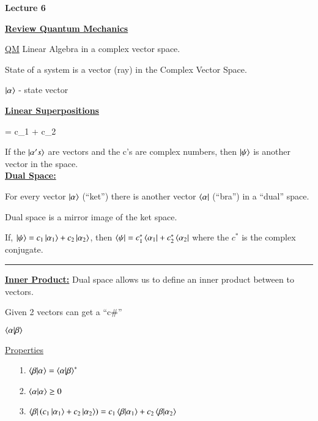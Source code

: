 



\thispagestyle{fancy}

\begin{center}
{\huge \textbf{Lecture 6}}
\end{center}

{\fontsize{14}{16}\selectfont

\textbf{\underline{Review Quantum Mechanics}} 

\underline{QM} Linear Algebra in a complex vector space.

State of a system is a vector (ray) in the Complex Vector Space. 

\begin{center}
$\ket \alpha$  - state vector
\end{center}


\textbf{\underline{Linear Superpositions} }

\be
\ket \psi = c_1  + c_2 
\ee

If the $\ket{\alpha's}$ are vectors and the c's are complex numbers, then $\ket \psi$ is another vector in the space.\\


\textbf{\underline{Dual Space:}}

For every vector $\ket \alpha$ (``ket'') there is another vector $\bra \alpha$ (``bra'') in a ``dual'' space.

Dual space is a mirror image  of the ket space.


If, $\ket \psi = c_1 \ket{\alpha_1} + c_2 \ket{\alpha_2}$, then $\bra \psi = c_1^* \bra{\alpha_1} + c_2^* \bra{\alpha_2}$
where the $c^*$ is the complex conjugate.

\noindent\rule{\textwidth}{1pt}

\textbf{\underline{Inner Product:}} Dual space allows us to define an inner product between to vectors. 

Given 2 vectors can get a ``c\#'' 

$\braket{\alpha|\beta}$

\underline{Properties}
\begin{itemize}
\item[1.] $\braket{\beta|\alpha} = \braket{\alpha| \beta}^*$
\item[2.] $\braket{\alpha|\alpha} \geq 0$
\item[3.] $\bra{\beta} (c_1 \ket{\alpha_1} + c_2 \ket{\alpha_2} ) =  c_1 \braket{\beta|\alpha_1} + c_2 \braket{\beta| \alpha_2}$
\end{itemize}

}
